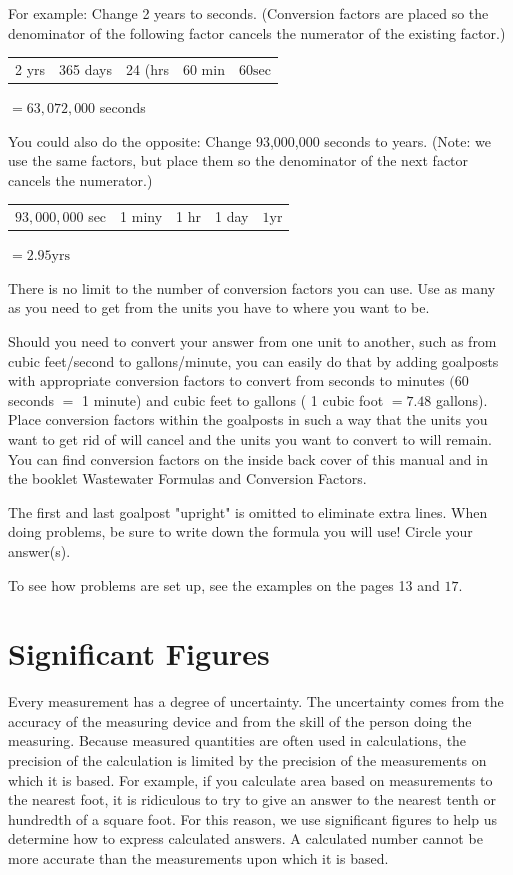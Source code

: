\documentclass[10pt]{article}
\begin{document}
For example: Change 2 years to seconds. (Conversion factors are placed so the denominator of the following factor cancels the numerator of the existing factor.)

\begin{tabular}{c|c|c|c|c|}
2 yrs & 365 days & 24 (hrs & 60 min & $60 \mathrm{sec}$ \\
\end{tabular}$=63,072,000$ seconds

You could also do the opposite: Change 93,000,000 seconds to years. (Note: we use the same factors, but place them so the denominator of the next factor cancels the numerator.)

\begin{tabular}{l|c|c|c|c|}
$93,000,000$ sec & 1 miny & 1 hr & 1 day & $1 \mathrm{yr}$ \\
\end{tabular}$=2.95 \mathrm{yrs}$

There is no limit to the number of conversion factors you can use. Use as many as you need to get from the units you have to where you want to be.

Should you need to convert your answer from one unit to another, such as from cubic feet/second to gallons/minute, you can easily do that by adding goalposts with appropriate conversion factors to convert from seconds to minutes $(60$ seconds $=$ 1 minute) and cubic feet to gallons ( 1 cubic foot $=7.48$ gallons). Place conversion factors within the goalposts in such a way that the units you want to get rid of will cancel and the units you want to convert to will remain. You can find conversion factors on the inside back cover of this manual and in the booklet Wastewater Formulas and Conversion Factors.

The first and last goalpost "upright" is omitted to eliminate extra lines. When doing problems, be sure to write down the formula you will use! Circle your answer(s).

To see how problems are set up, see the examples on the pages 13 and $17 .$

\section{Significant Figures}
Every measurement has a degree of uncertainty. The uncertainty comes from the accuracy of the measuring device and from the skill of the person doing the measuring. Because measured quantities are often used in calculations, the precision of the calculation is limited by the precision of the measurements on which it is based. For example, if you calculate area based on measurements to the nearest foot, it is ridiculous to try to give an answer to the nearest tenth or hundredth of a square foot. For this reason, we use significant figures to help us determine how to express calculated answers. A calculated number cannot be more accurate than the measurements upon which it is based.
\end{document}
